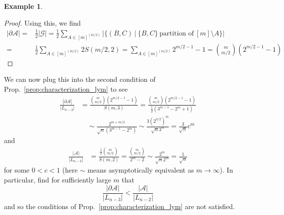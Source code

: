 \documentclass{scrartcl}
\theoremstyle{definition}
\newtheorem{example}[definition]{Example}
\begin{document}
\begin{example}
\begin{proof}
        Using this, we find
        \begin{align*}
            |\partial \mathcal{A}| =& \frac 1 2 |\mathcal{G}| = \frac 1 2 \sum_{A \in [m]^{(m/2)}} |\{ (B, C) \ | \ \{ B, C \} \ \text{partition of} \ [m] \setminus A \}| \\
            =& \frac 1 2 \sum_{A \in [m]^{(m/2)}} 2 S(m/2, 2) = \sum_{A \in [m]^{(m/2)}} 2^{m/2 - 1} - 1 = {m \choose m/2} \left( 2^{m/2 - 1} - 1 \right)
        \end{align*}
    \end{proof}
    We can now plug this into the second condition of Prop.~\ref{prop:characterization_lym} to see
    \begin{align*}
        \frac {|\partial \mathcal{A}|} {|L_{n - 3}|} &= \frac {{m \choose m/2}\left( 2^{m/2 - 1} - 1\right)} {S(m, 3)} = \frac {{m \choose m/2}\left( 2^{m/2 - 1} - 1\right)} {\frac 1 2 \left( 3^{m - 1} - 2^m + 1 \right)} \\
        &\quad \sim \frac {2^{m + m/2}} {\sqrt{n}(3^{m - 1} - 2^m)} \sim \frac {3 \left( 2^{3/2} \right)^m} {\sqrt{n} 3^m} = \frac 3 {\sqrt{n}} c^m
    \end{align*}
    and
    \begin{align*}
        \frac {|\mathcal{A}|} {|L_{n - 2}|} &= \frac {\frac 1 2 {m \choose m/2}} {S(m, 2)} = \frac {{m \choose m/2}} {2^m - 2} \sim \frac {2^m} {\sqrt{n}2^m} = \frac 1 {\sqrt{n}}
    \end{align*}
    for some $0 < c < 1$ (here $\sim$ means asymptotically equivalent as $m \to \infty$).
    In particular, find for sufficiently large $m$ that
    \begin{equation*}
        \frac {|\partial \mathcal{A}|} {|L_{n - 3}|} < \frac {|\mathcal{A}|} {|L_{n - 2}|}
    \end{equation*}
    and so the conditions of Prop.~\ref{prop:characterization_lym} are not satisfied.
\end{example}
\end{document}
